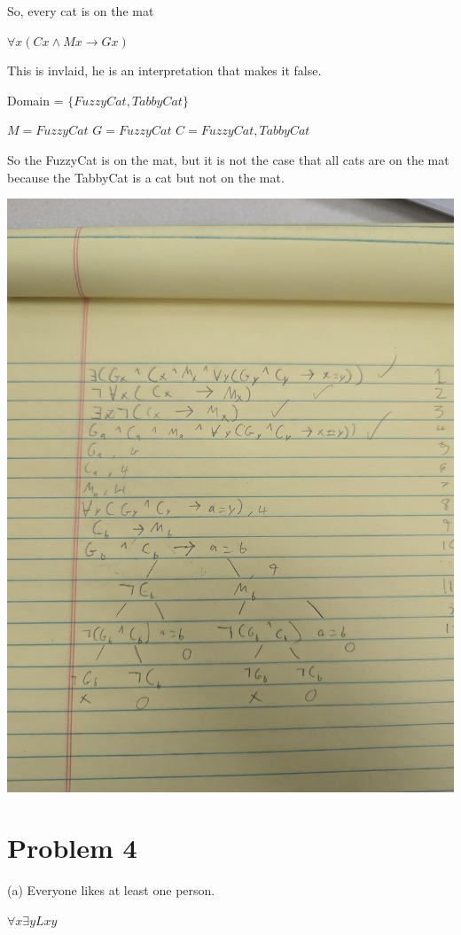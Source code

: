 \documentclass[12pt]{article}
\begin{document}
So, every cat is on the mat

$\forall x (Cx \land Mx \rightarrow Gx)$

This is invlaid, he is an interpretation that makes it false. 

Domain = $\{FuzzyCat, TabbyCat\}$

$M = {FuzzyCat}$
$G = {FuzzyCat}$
$C = {FuzzyCat, TabbyCat}$

So the FuzzyCat is on the mat, but it is not the case that all cats are on the mat because the TabbyCat is a cat but not on the mat. 

\includegraphics[width=\textwidth]{3b}


\section*{Problem 4}

(a) Everyone likes at least one person. 

$\forall x \exists y Lxy$
\end{document}

